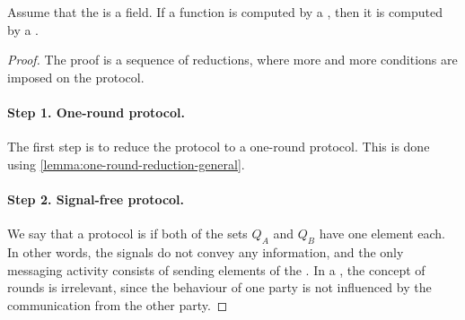 \begin{lemma}\label{lem:scalar-product-reduction}
  Assume that the  is a field. 
  If a function is computed by a , 
  then it is computed by a .
\end{lemma}
\begin{proof}
    The proof is a sequence of reductions, 
    where more and more conditions are imposed on the protocol.  
    
    \paragraph*{Step 1. One-round protocol.} 
    The first step is to reduce the protocol to a one-round protocol. 
    This is done using \cref{lemma:one-round-reduction-general}.



 \paragraph*{Step 2. Signal-free protocol.}  \AP 
 We say that a protocol is
  if both of the sets $Q_A$ and $Q_B$ have one element each.
 In other words, the signals do not convey any information, and the only
 messaging activity consists of sending elements of the . In a
 , the concept of rounds is irrelevant, since the behaviour
 of one party is not influenced by the communication from the other party.



\end{proof}
